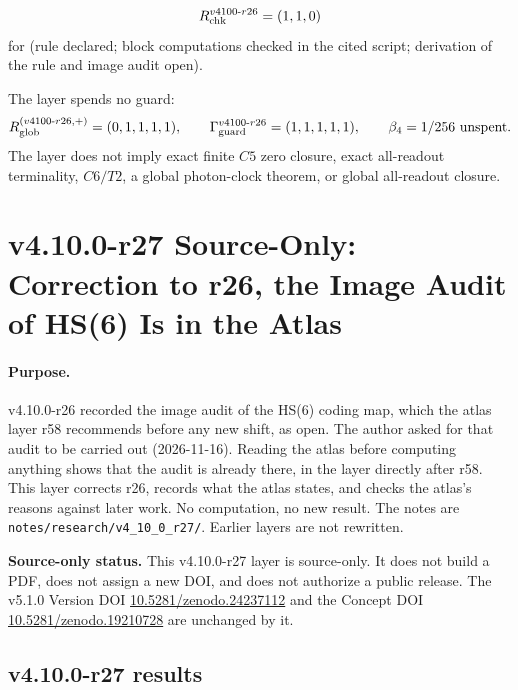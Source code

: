 \[
R_{\rm chk}^{v4100\text{-}r26}=(1,1,0)
\]
for (rule declared; block computations checked in the cited script; derivation of the rule and image audit open).

The layer spends no guard:
\[
R_{\rm glob}^{(v4100\text{-}r26,+)}=(0,1,1,1,1),
\qquad
\Gamma_{\rm guard}^{v4100\text{-}r26}=(1,1,1,1,1),
\qquad
\beta_4=1/256\ \text{unspent}.
\]
The layer does not imply exact finite \(C5\) zero closure, exact all-readout terminality, \(C6/T2\), a global photon-clock theorem,
or global all-readout closure.

\clearpage
\section*{v4.10.0-r27 Source-Only: Correction to r26, the Image Audit of HS(6) Is in the Atlas}
\label{sec:v4100-r27-image-audit-correction}

\paragraph{Purpose.}
v4.10.0-r26 recorded the image audit of the HS(6) coding map, which the atlas layer r58 recommends before any new shift, as open.  The
author asked for that audit to be carried out (2026-11-16).  Reading the atlas before computing anything shows that the audit is already
there, in the layer directly after r58.  This layer corrects r26, records what the atlas states, and checks the atlas's reasons against later work.  No computation, no new result.  The
notes are \texttt{notes/\allowbreak research/\allowbreak v4\_10\_0\_r27/}.  Earlier layers are not rewritten.

\noindent\textbf{Source-only status.}
This v4.10.0-r27 layer is source-only.  It does not build a PDF, does not assign a new DOI,
and does not authorize a public release.  The v5.1.0 Version DOI
\href{https://doi.org/10.5281/zenodo.24237112}{10.5281/zenodo.24237112} and the Concept DOI
\href{https://doi.org/10.5281/zenodo.19210728}{10.5281/zenodo.19210728} are unchanged by it.

\subsection*{v4.10.0-r27 results}
\label{subsec:v4100-r27-results}

